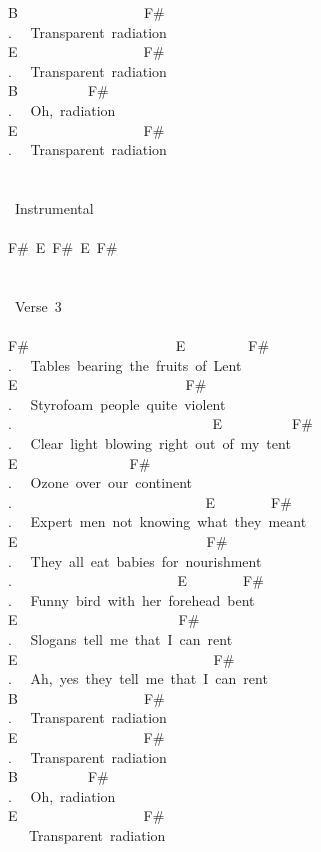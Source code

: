 {B\ \ \ \ \ \ \ \ \ \ \ \ \ \ \ \ \ \ F\#\ \\
. \ \ Transparent\ radiation\\
E\ \ \ \ \ \ \ \ \ \ \ \ \ \ \ \ \ \ F\#\\
. \ \ Transparent\ radiation\\
B\ \ \ \ \ \ \ \ \ \ F\#\\
. \ \ Oh,\ radiation\\
E\ \ \ \ \ \ \ \ \ \ \ \ \ \ \ \ \ \ F\#\\
. \ \ Transparent\ radiation\\
\\
\\
\lbrack\ Instrumental\rbrack\\
\\
F\#\ E\ F\#\ E\ F\#\\
\\
\\
\lbrack\ Verse\ 3\rbrack\\
\\
F\#\ \ \ \ \ \ \ \ \ \ \ \ \ \ \ \ \ \ \ \ \ E\ \ \ \ \ \ \ \ \ F\#\\
. \ \ Tables\ bearing\ the\ fruits\ of\ Lent\\
E\ \ \ \ \ \ \ \ \ \ \ \ \ \ \ \ \ \ \ \ \ \ \ \ F\#\\
. \ \ Styrofoam\ people\ quite\ violent\\
. \ \ \ \ \ \ \ \ \ \ \ \ \ \ \ \ \ \ \ \ \ \ \ \ \ \ \ \ E\ \ \ \ \ \ \ \ \ \ F\#\\
. \ \ Clear\ light\ blowing\ right\ out\ of\ my\ tent\\
E\ \ \ \ \ \ \ \ \ \ \ \ \ \ \ \ F\#\\
. \ \ Ozone\ over\ our\ continent\\
. \ \ \ \ \ \ \ \ \ \ \ \ \ \ \ \ \ \ \ \ \ \ \ \ \ \ \ E\ \ \ \ \ \ \ \ F\#\\
. \ \ Expert\ men\ not\ knowing\ what\ they\ meant\\
E\ \ \ \ \ \ \ \ \ \ \ \ \ \ \ \ \ \ \ \ \ \ \ \ \ \ \ F\#\\
. \ \ They\ all\ eat\ babies\ for\ nourishment\\
. \ \ \ \ \ \ \ \ \ \ \ \ \ \ \ \ \ \ \ \ \ \ \ E\ \ \ \ \ \ \ \ F\#\\
. \ \ Funny\ bird\ with\ her\ forehead\ bent\\
E\ \ \ \ \ \ \ \ \ \ \ \ \ \ \ \ \ \ \ \ \ \ \ F\#\\
. \ \ Slogans\ tell\ me\ that\ I\ can\ rent\\
E\ \ \ \ \ \ \ \ \ \ \ \ \ \ \ \ \ \ \ \ \ \ \ \ \ \ \ \ F\#\\
. \ \ Ah,\ yes\ they\ tell\ me\ that\ I\ can\ rent\\
B\ \ \ \ \ \ \ \ \ \ \ \ \ \ \ \ \ \ F\#\ \\
. \ \ Transparent\ radiation\\
E\ \ \ \ \ \ \ \ \ \ \ \ \ \ \ \ \ \ F\#\\
. \ \ Transparent\ radiation\\
B\ \ \ \ \ \ \ \ \ \ F\#\\
. \ \ Oh,\ radiation\\
E\ \ \ \ \ \ \ \ \ \ \ \ \ \ \ \ \ \ F\#\\
\ \ \ Transparent\ radiation\ }

